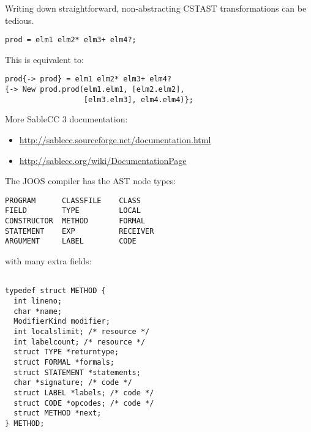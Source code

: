 \begin{slide*}

Writing down straightforward, non-abstracting CST\RA{}AST
transformations can be tedious.

\begin{scriptsize}
\begin{verbatim}
prod = elm1 elm2* elm3+ elm4?;
\end{verbatim}
\end{scriptsize}

This is equivalent to:

\begin{scriptsize}
\begin{verbatim}
prod{-> prod} = elm1 elm2* elm3+ elm4? 
{-> New prod.prod(elm1.elm1, [elm2.elm2], 
                  [elm3.elm3], elm4.elm4)};
\end{verbatim}
\end{scriptsize}

More SableCC 3 documentation:

\begin{itemize}
\item {\scriptsize\url{http://sablecc.sourceforge.net/documentation.html}}
\item {\scriptsize\url{http://sablecc.org/wiki/DocumentationPage}}
\end{itemize}

\vfil
\end{slide*}


\begin{slide*}
The JOOS compiler has the AST node types:

\begin{scriptsize}
\begin{verbatim}
PROGRAM      CLASSFILE    CLASS 
FIELD        TYPE         LOCAL     
CONSTRUCTOR  METHOD       FORMAL
STATEMENT    EXP          RECEIVER
ARGUMENT     LABEL        CODE
\end{verbatim}
\end{scriptsize}

with many extra fields:

\begin{scriptsize}
\begin{verbatim}

typedef struct METHOD {
  int lineno;
  char *name;
  ModifierKind modifier; 
  int localslimit; /* resource */
  int labelcount; /* resource */
  struct TYPE *returntype;
  struct FORMAL *formals;
  struct STATEMENT *statements;
  char *signature; /* code */
  struct LABEL *labels; /* code */
  struct CODE *opcodes; /* code */
  struct METHOD *next;
} METHOD;
\end{verbatim}
\end{scriptsize}
\vfil
\end{slide*}
 
